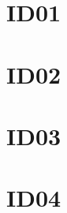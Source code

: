 \documentclass[a4paper,12pt]{article}
\begin{document}
\boldmath
\begin{multicols}{2}

\section*{ID01}


\newpage
\section*{ID02}


\newpage
\section*{ID03}


\newpage
\section*{ID04}


\unboldmath
\end{multicols}
\end{document}
